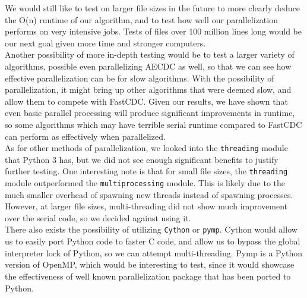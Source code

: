 \documentclass{acmtog} %
\begin{document}
	We would still like to test on larger file sizes in the future to more clearly deduce the O(n) runtime of our algorithm, and to test how well our parallelization performs on very intensive jobs. Tests of files over 100 million lines long would be our next goal given more time and stronger computers. \\
	
	Another possibility of more in-depth testing would be to test a larger variety of algorithms, possible even parallelizing AECDC as well, so that we can see how effective parallelization can be for slow algorithms. With the possibility of parallelization, it might bring up other algorithms that were deemed slow, and allow them to compete with FastCDC. Given our results, we have shown that even basic parallel processing will produce significant improvements in runtime, so some algorithms which may have terrible serial runtime compared to FastCDC can perform as effectively when parallelized. \\
	

	As for other methods of parallelization, we looked into the \texttt{threading} module that Python 3 has, but we did not see enough significant benefits to justify further testing. One interesting note is that for small file sizes, the \texttt{threading} module outperformed the \texttt{multiprocessing} module. This is likely due to the much smaller overhead of spawning new threads instead of spawning processes. However, at larger file sizes, multi-threading did not show much improvement over the serial code, so we decided against using it. \\
	
	There also exists the possibility of utilizing \texttt{Cython} or \texttt{pymp}. Cython would allow us to easily port Python code to faster C code, and allow us to bypass the global interpreter lock of Python, so we can attempt multi-threading. Pymp is a Python version of OpenMP, which would be interesting to test, since it would showcase the effectiveness of well known parallelization package that has been ported to Python. 
	
\end{document}
